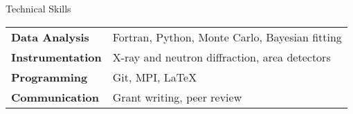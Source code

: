 
\begin{rubric}{Technical Skills}
\begin{tabular}{@{}ll@{}}
\textbf{Data Analysis} & Fortran, Python, Monte Carlo, Bayesian fitting\\
\textbf{Instrumentation} & X-ray and neutron diffraction, area detectors\\
\textbf{Programming} & Git, MPI, LaTeX\\
\textbf{Communication} & Grant writing, peer review\\
\end{tabular}
\end{rubric}
